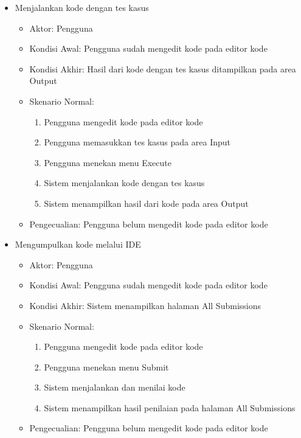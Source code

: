\begin{itemize}
    
    \item Menjalankan kode dengan tes kasus
        \begin{itemize}
            \item Aktor: Pengguna
            \item Kondisi Awal: Pengguna sudah mengedit kode pada editor kode
            \item Kondisi Akhir: Hasil dari kode dengan tes kasus ditampilkan pada area Output
            \item Skenario Normal:
                \begin{enumerate}
                    \item Pengguna mengedit kode pada editor kode
                    \item Pengguna memasukkan tes kasus pada area Input
                    \item Pengguna menekan menu Execute
                    \item Sistem menjalankan kode dengan tes kasus
                    \item Sistem menampilkan hasil dari kode pada area Output
                \end{enumerate}
            \item Pengecualian:  Pengguna belum mengedit kode pada editor kode
        \end{itemize}
    
    
    \item Mengumpulkan kode melalui IDE
        \begin{itemize}
            \item Aktor: Pengguna
            \item Kondisi Awal: Pengguna sudah mengedit kode pada editor kode
            \item Kondisi Akhir: Sistem menampilkan halaman All Submissions
            \item Skenario Normal:
                \begin{enumerate}
                    \item Pengguna mengedit kode pada editor kode
                    \item Pengguna menekan menu Submit
                    \item Sistem menjalankan dan menilai kode
                    \item Sistem menampilkan hasil penilaian pada halaman All Submissions 
                \end{enumerate}
            \item Pengecualian:  Pengguna belum mengedit kode pada editor kode
        \end{itemize}
\end{itemize}

